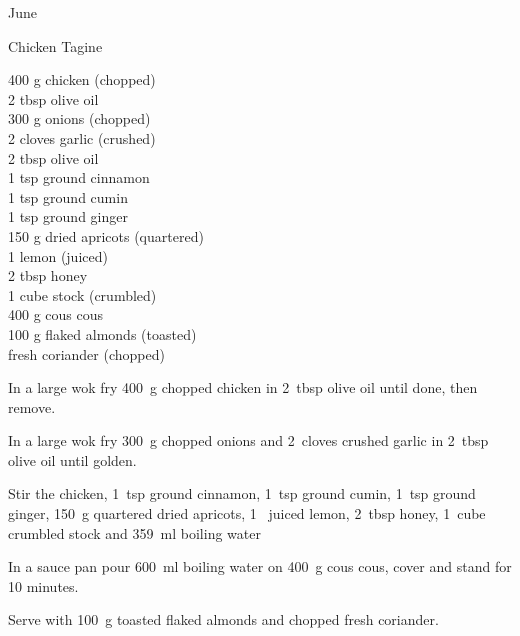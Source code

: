 \begin{menu}{June}
    \begin{recipe}{2}{Chicken Tagine}%
    
		\begin{ingredients}
		400 g chicken (chopped) \\
	2 tbsp olive oil  \\
	300 g onions (chopped) \\
	2 cloves garlic (crushed) \\
	2 tbsp olive oil  \\
	1 tsp ground cinnamon  \\
	1 tsp ground cumin  \\
	1 tsp ground ginger  \\
	150 g dried apricots (quartered) \\
	1  lemon (juiced) \\
	2 tbsp honey  \\
	1 cube stock (crumbled) \\
	400 g cous cous  \\
	100 g flaked almonds (toasted) \\
	  fresh coriander (chopped) \\
	
		\end{ingredients}
	
    \begin{instructions}
    \item 
        In a large wok fry
        400~g chopped chicken
        in
        2~tbsp  olive oil
        until done, then remove.
      \item 
        In a large wok fry
        300~g chopped onions
        and
        2~cloves crushed garlic
        in
        2~tbsp  olive oil
        until golden.
      \item 
        Stir the chicken,
        1~tsp  ground cinnamon,
        1~tsp  ground cumin,
        1~tsp  ground ginger,
        150~g quartered dried apricots,
        1~ juiced lemon,
        2~tbsp  honey,
        1~cube crumbled stock
        and
        359~ml  boiling water\item 
      In a
      sauce pan pour 600~ml  boiling water
      on 400~g  cous cous, cover and
      stand for 10 minutes.
    \item 
        Serve with
        100~g toasted flaked almonds
        and
         chopped fresh coriander.
      
    \end{instructions}
    \end{recipe}%
  
    \clearpage
    \end{menu}
	
